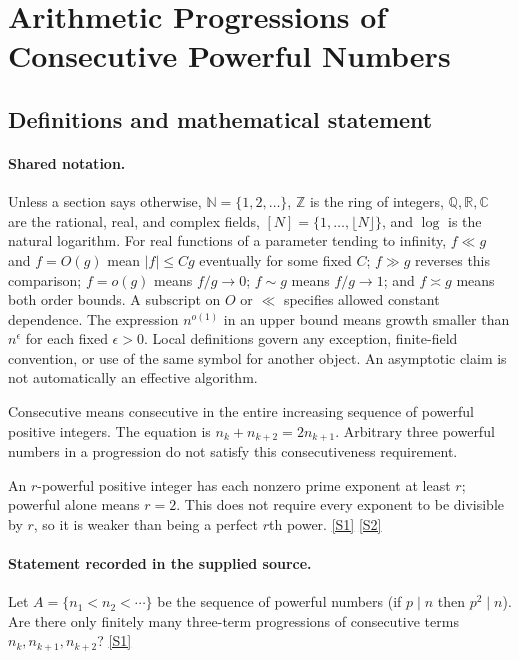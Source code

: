 \documentclass[11pt,a4paper]{article}
\newcommand{\N}{\mathbb{N}}
\newcommand{\Z}{\mathbb{Z}}
\newcommand{\Q}{\mathbb{Q}}
\newcommand{\R}{\mathbb{R}}
\newcommand{\C}{\mathbb{C}}
\newcommand{\sref}[2]{\hyperlink{source:#1:#2}{[S#2]}}
\begin{document}
\section{Arithmetic Progressions of Consecutive Powerful Numbers}\label{statement}


\subsection{Definitions and mathematical statement}

\paragraph{Shared notation.}Unless a section says otherwise, $\N=\{1,2,\ldots\}$,
$\Z$ is the ring of integers, $\Q,\R,\C$ are the rational, real, and complex
fields, $[N]=\{1,\ldots,\lfloor N\rfloor\}$, and $\log$ is the natural
logarithm. For real functions of a parameter tending to infinity,
$f\ll g$ and $f=O(g)$ mean $|f|\leq Cg$ eventually for some fixed $C$;
$f\gg g$ reverses this comparison; $f=o(g)$ means $f/g\to0$;
$f\sim g$ means $f/g\to1$; and $f\asymp g$ means both order bounds.
A subscript on $O$ or $\ll$ specifies allowed constant dependence.
The expression $n^{o(1)}$ in an upper bound means growth smaller than
$n^\epsilon$ for each fixed $\epsilon>0$. Local definitions govern any
exception, finite-field convention, or use of the same symbol for another
object. An asymptotic claim is not automatically an effective algorithm.



Consecutive means consecutive in the entire increasing sequence of powerful positive integers. The equation is $n_k+n_{k+2}=2n_{k+1}$. Arbitrary three powerful numbers in a progression do not satisfy this consecutiveness requirement.

An $r$-powerful positive integer has each nonzero prime exponent at least $r$; powerful alone means $r=2$. This does not require every exponent to be divisible by $r$, so it is weaker than being a perfect $r$th power. \sref{statement}{1} \sref{statement}{2}

\paragraph{Statement recorded in the supplied source.}
Let $A=\{n_1<n_2<\cdots\}$ be the sequence of powerful numbers (if $p\mid n$ then $p^2\mid n$).
Are there only finitely many three-term progressions of consecutive terms $n_k,n_{k+1},n_{k+2}$? \sref{statement}{1}
\end{document}
